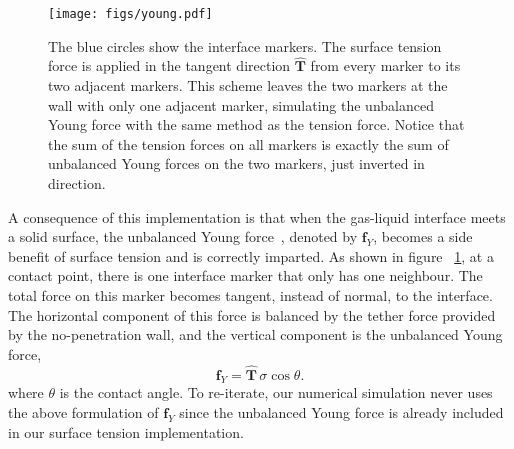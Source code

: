 \documentclass{jfm}
\begin{document}
\begin{figure}
    \centering
    \texttt{[image: figs/young.pdf]}
    \caption{\label{fig:young}
        The blue circles show the interface markers. The surface tension force is applied in the tangent direction $\bm{\hat{T}}$ from every marker to its two adjacent markers. This scheme leaves the two markers at the wall with only one adjacent marker, simulating the unbalanced Young force with the same method as the tension force. Notice that the sum of the tension forces on all markers is exactly the sum of unbalanced Young forces on the two markers, just inverted in direction. 
    }
\end{figure}
A consequence of this implementation is that when the gas-liquid interface meets a solid surface, the unbalanced Young force~\citep{quian2003generalized}, denoted by $\bm{f}_Y$, becomes a side benefit of surface tension and is correctly imparted. As shown in figure ~\ref{fig:young}, at a contact point, there is one interface marker that only has one neighbour. The total force on this marker becomes tangent, instead of normal, to the interface. The horizontal component of this force is balanced by the tether force provided by the no-penetration wall, and the vertical component is the unbalanced Young force, 
\begin{equation}
    \bm{f}_Y = \bm{\hat{T}} \, \sigma \cos\theta. \label{eq:young}
\end{equation}
where $\theta$ is the contact angle. To re-iterate, our numerical simulation never uses the above formulation of $\bm{f}_Y$ since the unbalanced Young force is already included in our surface tension implementation. 
\end{document}
